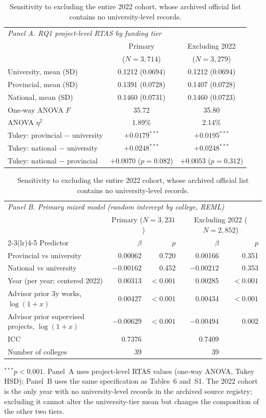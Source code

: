 \documentclass[11pt]{article}
\begin{document}
\begin{table}[H]
\centering
\caption{Sensitivity to excluding the entire 2022 cohort, whose archived official list contains no university-level records.}
\label{tab:s2}
\footnotesize
\begin{tabular}{lcc}
\toprule
\multicolumn{3}{l}{\textit{Panel A. RQ1 project-level RTAS by funding tier}}\\
& Primary & Excluding 2022\\
& ($N=3{,}714$) & ($N=3{,}279$)\\
\midrule
University, mean (SD) & 0.1212 (0.0694) & 0.1212 (0.0694)\\
Provincial, mean (SD) & 0.1391 (0.0728) & 0.1407 (0.0728)\\
National, mean (SD) & 0.1460 (0.0731) & 0.1460 (0.0723)\\
One-way ANOVA $F$ & 35.72 & 35.80\\
ANOVA $\eta^2$ & 1.89\% & 2.14\%\\
Tukey: provincial $-$ university & $+0.0179^{***}$ & $+0.0195^{***}$\\
Tukey: national $-$ university & $+0.0248^{***}$ & $+0.0248^{***}$\\
Tukey: national $-$ provincial & $+0.0070$ ($p=0.082$) & $+0.0053$ ($p=0.312$)\\
\bottomrule
\end{tabular}

\vspace{1.5em}

\begin{tabular}{lrrrr}
\toprule
\multicolumn{5}{l}{\textit{Panel B. Primary mixed model (random intercept by college, REML)}}\\
& \multicolumn{2}{c}{Primary ($N=3{,}231$)} & \multicolumn{2}{c}{Excluding 2022 ($N=2{,}852$)}\\
\cmidrule(lr){2-3}\cmidrule(lr){4-5}
Predictor & $\beta$ & $p$ & $\beta$ & $p$\\
\midrule
Provincial vs university & 0.00062 & 0.720 & 0.00166 & 0.351\\
National vs university & $-0.00162$ & 0.452 & $-0.00212$ & 0.353\\
Year (per year; centered 2022) & 0.00313 & $<0.001$ & 0.00285 & $<0.001$\\
Advisor prior 3y works, $\log(1+x)$ & 0.00427 & $<0.001$ & 0.00434 & $<0.001$\\
Advisor prior supervised projects, $\log(1+x)$ & $-0.00629$ & $<0.001$ & $-0.00494$ & 0.002\\
\midrule
ICC & 0.7376 & & 0.7409 & \\
Number of colleges & 39 & & 39 & \\
\bottomrule
\end{tabular}

\vspace{1mm}
\footnotesize $^{***}p<0.001$. Panel~A uses project-level RTAS values (one-way ANOVA, Tukey HSD); Panel~B uses the same specification as Tables~6 and~S1. The 2022 cohort is the only year with no university-level records in the archived source registry; excluding it cannot alter the university-tier mean but changes the composition of the other two tiers.
\end{table}
\end{document}
